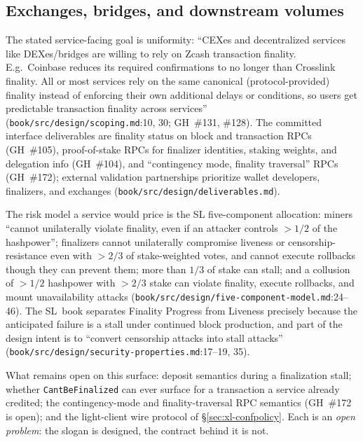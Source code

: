 \documentclass[11pt,a4paper]{article}
\theoremstyle{definition}
\begin{document}
\subsection{Exchanges, bridges, and downstream volumes}
\label{sec:xl-services}

The stated service-facing goal is uniformity: ``CEXes and decentralized
services like DEXes/bridges are willing to rely on Zcash transaction
finality. E.g.\ Coinbase reduces its required confirmations to no longer
than Crosslink finality. All or most services rely on the same canonical
(protocol-provided) finality instead of enforcing their own additional
delays or conditions, so users get predictable transaction finality
across services'' (\texttt{book/src/design/scoping.md}:10, 30; GH~\#131,
\#128). The committed interface deliverables are finality status on block
and transaction RPCs (GH~\#105), proof-of-stake RPCs for finalizer
identities, staking weights, and delegation info (GH~\#104), and
``contingency mode, finality traversal'' RPCs (GH~\#172); external
validation partnerships prioritize wallet developers, finalizers, and
exchanges (\texttt{book/src/design/deliverables.md}).

The risk model a service would price is the SL five-component
allocation: miners ``cannot unilaterally violate finality, even if an
attacker controls $>1/2$ of the hashpower''; finalizers cannot
unilaterally compromise liveness or censorship-resistance even with
$>2/3$ of stake-weighted votes, and cannot execute rollbacks though they
can prevent them; more than $1/3$ of stake can stall; and a collusion of
$>1/2$ hashpower with $>2/3$ stake can violate finality, execute
rollbacks, and mount unavailability attacks
(\texttt{book/src/design/five-component-model.md}:24--46). The SL~book
separates Finality Progress from Liveness precisely because the
anticipated failure is a stall under continued block production, and part
of the design intent is to ``convert censorship attacks into stall
attacks'' (\texttt{book/src/design/security-properties.md}:17--19, 35).

What remains open on this surface: deposit semantics during a
finalization stall; whether \texttt{CantBeFinalized} can ever surface for
a transaction a service already credited; the contingency-mode and
finality-traversal RPC semantics (GH~\#172 is open); and the light-client
wire protocol of \S\ref{sec:xl-confpolicy}. Each is an \emph{open
problem}: the slogan is designed, the contract behind it is not.
\end{document}
